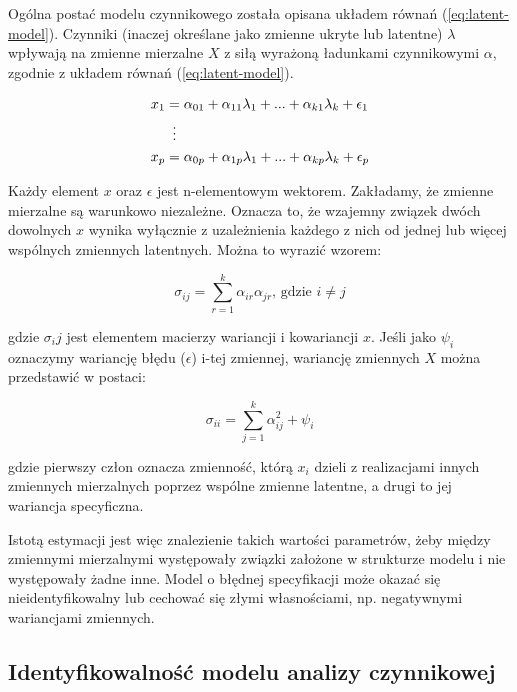 \documentclass[12pt]{article}
\begin{document}
Ogólna postać modelu czynnikowego została opisana układem równań (\ref{eq:latent-model}). Czynniki (inaczej określane jako zmienne ukryte lub latentne) \(\lambda\) wpływają na zmienne mierzalne \(X\) z siłą wyrażoną ładunkami czynnikowymi \(\alpha\), zgodnie z układem równań (\ref{eq:latent-model}).

\begin{align} 
\label{eq:latent-model}
\begin{split}
x_1 &= \alpha_{01} + \alpha_{11} \lambda_1 + ... + \alpha_{k1} \lambda_k + \epsilon_1\\
& \vdotswithin{=} \\
x_p &= \alpha_{0p} + \alpha_{1p} \lambda_1 + ... + \alpha_{kp} \lambda_k + \epsilon_p\\
\end{split}
\end{align}

Każdy element \(x\) oraz \(\epsilon\) jest n-elementowym wektorem. Zakładamy, że zmienne mierzalne są warunkowo niezależne. Oznacza to, że wzajemny związek dwóch dowolnych \(x\) wynika wyłącznie z uzależnienia każdego z nich od jednej lub więcej wspólnych zmiennych latentnych. Można to wyrazić wzorem:

\begin{equation}
\label{eq:shared-var}
\sigma_{ij} = \sum_{r=1}^k \alpha_{ir} \alpha_{jr} \text{, gdzie } i \neq j
\end{equation}

gdzie \(\sigma_ij\) jest elementem macierzy wariancji i kowariancji \(x\).
Jeśli jako \(\psi_i\) oznaczymy wariancję błędu (\(\epsilon\)) i-tej zmiennej, wariancję zmiennych \(X\) można przedstawić w postaci:

\begin{equation}
\label{eq:spec-var}
\sigma_{ii} = \sum_{j=1}^k \alpha_{ij}^2 + \psi_i
\end{equation}

gdzie pierwszy człon oznacza zmienność, którą \(x_i\) dzieli z realizacjami innych zmiennych mierzalnych poprzez wspólne zmienne latentne, a drugi to jej wariancja specyficzna.

Istotą estymacji jest więc znalezienie takich wartości parametrów, żeby między zmiennymi mierzalnymi występowały związki założone w strukturze modelu i nie występowały żadne inne. Model o błędnej specyfikacji może okazać się nieidentyfikowalny lub cechować się złymi własnościami, np. negatywnymi wariancjami zmiennych.

\hypertarget{identyfikowalnoux15bux107-modelu-analizy-czynnikowej}{%
\subsection{Identyfikowalność modelu analizy czynnikowej}\label{identyfikowalnoux15bux107-modelu-analizy-czynnikowej}}
\end{document}
